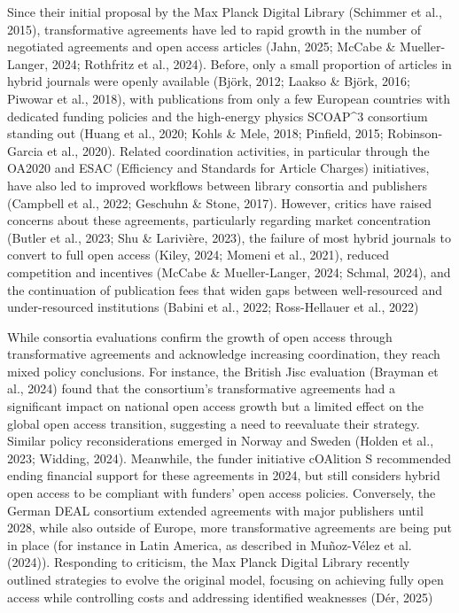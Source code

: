 \documentclass[a4paper,man,floatsintext,longtable,noextraspace,10pt]{apa6}
\begin{document}
Since their initial proposal by the Max Planck Digital Library (Schimmer
et al., 2015), transformative agreements have led to rapid growth in the
number of negotiated agreements and open access articles (Jahn, 2025;
McCabe \& Mueller-Langer, 2024; Rothfritz et al., 2024). Before, only a
small proportion of articles in hybrid journals were openly available
(Björk, 2012; Laakso \& Björk, 2016; Piwowar et al., 2018), with
publications from only a few European countries with dedicated funding
policies and the high-energy physics SCOAP\^{}3 consortium standing out
(Huang et al., 2020; Kohls \& Mele, 2018; Pinfield, 2015;
Robinson-Garcia et al., 2020). Related coordination activities, in
particular through the OA2020 and ESAC (Efficiency and Standards for
Article Charges) initiatives, have also led to improved workflows
between library consortia and publishers (Campbell et al., 2022;
Geschuhn \& Stone, 2017). However, critics have raised concerns about
these agreements, particularly regarding market concentration (Butler et
al., 2023; Shu \& Larivière, 2023), the failure of most hybrid journals
to convert to full open access (Kiley, 2024; Momeni et al., 2021),
reduced competition and incentives (McCabe \& Mueller-Langer, 2024;
Schmal, 2024), and the continuation of publication fees that widen gaps
between well-resourced and under-resourced institutions (Babini et al.,
2022; Ross-Hellauer et al., 2022)

While consortia evaluations confirm the growth of open access through
transformative agreements and acknowledge increasing coordination, they
reach mixed policy conclusions. For instance, the British Jisc
evaluation (Brayman et al., 2024) found that the consortium's
transformative agreements had a significant impact on national open
access growth but a limited effect on the global open access transition,
suggesting a need to reevaluate their strategy. Similar policy
reconsiderations emerged in Norway and Sweden (Holden et al., 2023;
Widding, 2024). Meanwhile, the funder initiative cOAlition S recommended
ending financial support for these agreements in 2024, but still
considers hybrid open access to be compliant with funders' open access
policies. Conversely, the German DEAL consortium extended agreements
with major publishers until 2028, while also outside of Europe, more
transformative agreements are being put in place (for instance in Latin
America, as described in Muñoz-Vélez et al. (2024)). Responding to
criticism, the Max Planck Digital Library recently outlined strategies
to evolve the original model, focusing on achieving fully open access
while controlling costs and addressing identified weaknesses (Dér, 2025)
\end{document}
